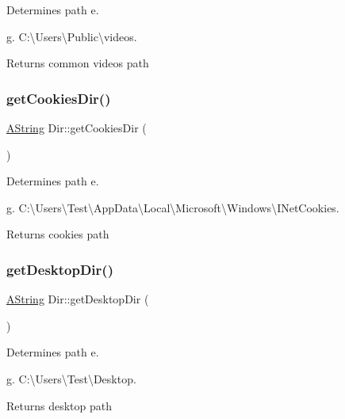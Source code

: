 Determines path e. 

g. C\+:\textbackslash{}\+Users\textbackslash{}\+Public\textbackslash{}videos. \begin{DoxyReturn}{Returns}
common videos path 
\end{DoxyReturn}
\mbox{\label{class_dir_a8bf7d83aa170fc5d09456719159c337f}} 
\subsubsection{\texorpdfstring{getCookiesDir()}{getCookiesDir()}}
{\footnotesize\ttfamily \mbox{\hyperlink{class_a_string}{A\+String}} Dir\+::get\+Cookies\+Dir (\begin{DoxyParamCaption}{ }\end{DoxyParamCaption})\hspace{0.3cm}{\ttfamily [static]}}



Determines path e. 

g. C\+:\textbackslash{}\+Users\textbackslash{}\+Test\textbackslash{}\+App\+Data\textbackslash{}\+Local\textbackslash{}\+Microsoft\textbackslash{}\+Windows\textbackslash{}\+I\+Net\+Cookies. \begin{DoxyReturn}{Returns}
cookies path 
\end{DoxyReturn}
\mbox{\label{class_dir_a1906abb3d8c6c8cfdec89bda40b0a616}} 
\subsubsection{\texorpdfstring{getDesktopDir()}{getDesktopDir()}}
{\footnotesize\ttfamily \mbox{\hyperlink{class_a_string}{A\+String}} Dir\+::get\+Desktop\+Dir (\begin{DoxyParamCaption}{ }\end{DoxyParamCaption})\hspace{0.3cm}{\ttfamily [static]}}



Determines path e. 

g. C\+:\textbackslash{}\+Users\textbackslash{}\+Test\textbackslash{}\+Desktop. \begin{DoxyReturn}{Returns}
desktop path 
\end{DoxyReturn}
\mbox{\label{class_dir_aab57bdc26a523e9476057d46825b109c}} 
